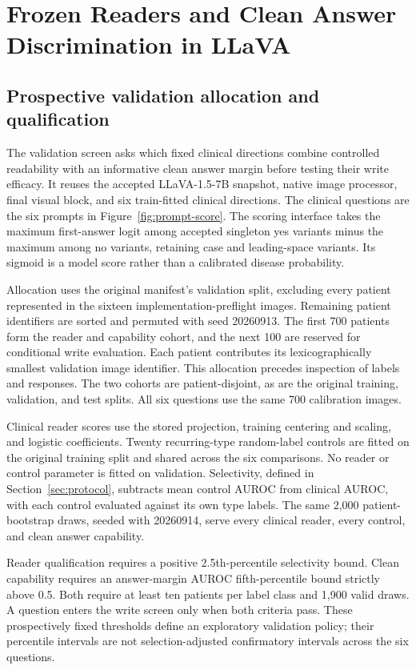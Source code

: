 \clearpage
\section{Frozen Readers and Clean Answer Discrimination in LLaVA}
\label{app:validation-readout}

\subsection{Prospective validation allocation and qualification}

The validation screen asks which fixed clinical directions combine
controlled readability with an informative clean answer margin before
testing their write efficacy. It reuses the accepted LLaVA-1.5-7B snapshot,
native image processor, final visual block, and six train-fitted clinical
directions. The clinical questions are the six prompts in
Figure~\ref{fig:prompt-score}. The scoring interface takes the maximum
first-answer logit among accepted singleton yes variants minus the maximum
among no variants, retaining case and leading-space variants. Its sigmoid
is a model score rather than a calibrated disease probability.

Allocation uses the original manifest's validation split, excluding every
patient represented in the sixteen implementation-preflight images.
Remaining patient identifiers are sorted and permuted with seed 20260913.
The first 700 patients form the reader and capability cohort, and the next
100 are reserved for conditional write evaluation. Each patient contributes
its lexicographically smallest validation image identifier. This allocation
precedes inspection of labels and responses. The two cohorts are
patient-disjoint, as are the original training, validation, and test splits.
All six questions use the same 700 calibration images.

Clinical reader scores use the stored projection, training centering and
scaling, and logistic coefficients. Twenty recurring-type random-label
controls are fitted on the original training split and shared across the
six comparisons. No reader or control parameter is fitted on validation.
Selectivity, defined in Section~\ref{sec:protocol}, subtracts mean control
AUROC from clinical AUROC, with each control evaluated against its own type
labels. The same 2,000 patient-bootstrap draws, seeded with 20260914, serve
every clinical reader, every control, and clean answer capability.

Reader qualification requires a positive 2.5th-percentile selectivity bound.
Clean capability requires an answer-margin AUROC fifth-percentile bound
strictly above 0.5. Both require at least ten patients per label class and
1,900 valid draws. A question enters the write screen only when both
criteria pass. These prospectively fixed thresholds define an exploratory
validation policy; their percentile intervals are not selection-adjusted
confirmatory intervals across the six questions.


